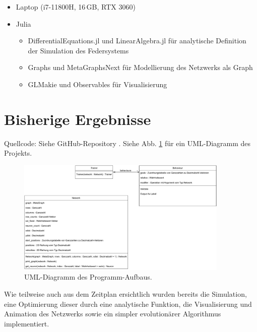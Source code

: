\documentclass[parskip]{scrartcl}
\begin{document}
\begin{itemize}
    \item Laptop (i7-11800H, 16\,GB, RTX 3060)
    \item Julia
    \begin{itemize}
        \item DifferentialEquations.jl und LinearAlgebra.jl für analytische Definition der Simulation des Federsystems
        \item Graphs und MetaGraphsNext für Modellierung des Netzwerks als Graph
        \item GLMakie und Observables für Visualisierung
    \end{itemize}
\end{itemize}



\section{Bisherige Ergebnisse}

Quellcode: Siehe GitHub-Repository \cite{RepoMNN}.
Siehe Abb. \ref{fig:uml} für ein UML-Diagramm des Projekts.

\begin{figure}
    \centering
    \includegraphics[width=0.9\textwidth]{uml.pdf}
    \caption{UML-Diagramm des Programm-Aufbaus.}
    \label{fig:uml}
\end{figure}

Wie teilweise auch aus dem Zeitplan ersichtlich wurden bereits die Simulation, eine Optimierung dieser durch eine analytische Funktion, die Visualisierung und Animation des Netzwerks sowie ein simpler evolutionärer Algorithmus implementiert.
\end{document}
